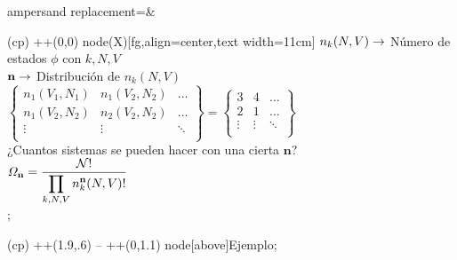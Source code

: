 \documentclass{beamer}
\begin{document}
\begin{zframe}{ampersand replacement=\&}

\Large    

     
      
        
(cp) ++(0,0) node(X)[fg,align=center,text width=11cm]{
$\displaystyle n_k(N,V)\rightarrow$ {\color{naranja} Número de estados $\phi$ con $k,N,V$}\\[5mm]
$\displaystyle\mathbf{n}\rightarrow$ Distribución de $n_k(N,V)$\\[8mm]
$\left\lbrace \begin{array}{rclc}
    n_1(V_1,N_1) & n_1(V_2,N_2) &  \hdots \\
    n_1(V_2,N_2) & n_2(V_2,N_2) &  \hdots \\
    \vdots       &   \vdots     &  \ddots \\
\end{array} \right\rbrace = 
\left\lbrace \begin{array}{rclc}
    3 & 4 &  \hdots \\
    2 & 1 &  \hdots \\
    \vdots       &   \vdots     &  \ddots \\
\end{array} \right\rbrace $
  \\[5mm]
¿Cuantos sistemas se pueden hacer con una cierta $\mathbf{n}$?\\[5mm]
$\displaystyle\Omega_{\mathbf{n}}=\dfrac{\mathcal{N}!}{\displaystyle\prod_{k,N,V}n_k^{\mathbf{n}}(N,V)!}$\\[5mm]
};     

(cp) ++(1.9,.6) -- ++(0,1.1) node[above]{Ejemplo};
  
\end{zframe}
       
\end{document}
